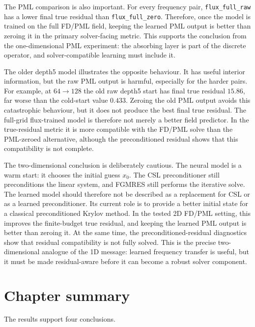 The PML comparison is also important. For every frequency pair,
\texttt{flux\_full\_raw} has a lower final true residual than
\texttt{flux\_full\_zero}. Therefore, once the model is trained on the full
FD/PML field, keeping the learned PML output is better than zeroing it in the
primary solver-facing metric. This supports the conclusion from the
one-dimensional PML experiment: the absorbing layer is part of the discrete
operator, and solver-compatible learning must include it.

The older depth5 model illustrates the opposite behaviour. It has useful
interior information, but the raw PML output is harmful, especially for the
harder pairs. For example, at $64\to128$ the old raw depth5 start has final
true residual $15.86$, far worse than the cold-start value $0.433$. Zeroing
the old PML output avoids this catastrophic behaviour, but it does not produce
the best final true residual. The full-grid flux-trained model is therefore
not merely a better field predictor. In the true-residual metric it is more
compatible with the FD/PML solve than the PML-zeroed alternative, although the
preconditioned residual shows that this compatibility is not complete.

The two-dimensional conclusion is deliberately cautious. The neural model is a
warm start: it chooses the initial guess $x_0$. The CSL preconditioner still
preconditions the linear system, and FGMRES still performs the iterative solve.
The learned model should therefore not be described as a replacement for CSL or
as a learned preconditioner. Its current role is to provide a better initial
state for a classical preconditioned Krylov method. In the tested 2D FD/PML
setting, this improves the finite-budget true residual, and keeping the
learned PML output is better than zeroing it. At the same time, the
preconditioned-residual diagnostics show that residual compatibility is not
fully solved. This is the precise two-dimensional analogue of the 1D message:
learned frequency transfer is useful, but it must be made residual-aware
before it can become a robust solver component.

\section{Chapter summary}
\label{sec:results-summary}

The results support four conclusions.

